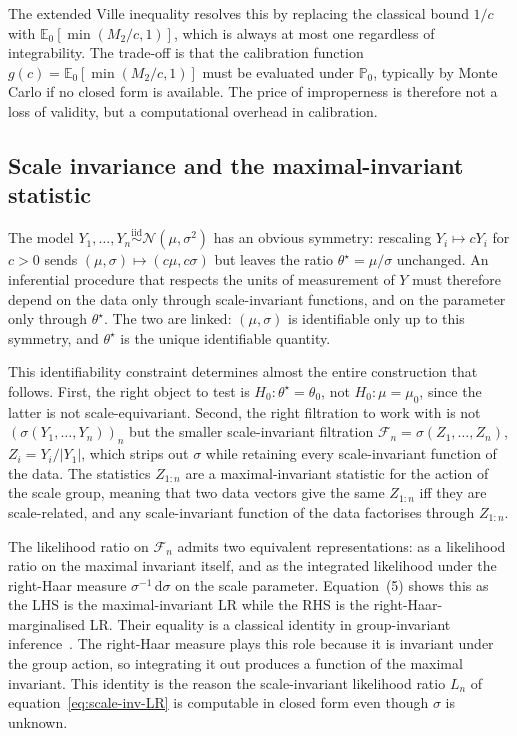 \documentclass[12pt, a4paper]{report}
\newcommand{\E}{\mathbb{E}}
\newcommand{\dd}{\,\mathrm{d}}
\newcommand{\1}{\mathbf{1}}
\begin{document}
The extended Ville inequality \citep{wang2025extended} resolves this by replacing the classical bound \(1/c\) with \(\E_0[\min(M_2/c,1)]\),
which is always at most one regardless of integrability. The trade-off
is that the calibration function \(g(c)=\E_0[\min(M_2/c,1)]\) must be
evaluated under \(\mathbb{P}_0\), typically by Monte Carlo if no closed form is available. The price of improperness is therefore not a loss of
validity, but a computational overhead in calibration.

\subsection{Scale invariance and the maximal-invariant statistic}
The model \(Y_1,\ldots,Y_n\stackrel{\mathrm{iid}}{\sim}\mathcal{N}(\mu,\sigma^2)\)
has an obvious symmetry: rescaling \(Y_i\mapsto cY_i\) for \(c>0\)
sends \((\mu,\sigma)\mapsto(c\mu,c\sigma)\) but leaves the ratio
\(\theta^\star=\mu/\sigma\) unchanged. An inferential procedure that
respects the units of measurement of \(Y\) must therefore depend on
the data only through scale-invariant functions, and on the parameter
only through \(\theta^\star\). The two are linked: \((\mu,\sigma)\) is
identifiable only up to this symmetry, and \(\theta^\star\) is the
unique identifiable quantity.

This identifiability constraint determines almost the entire
construction that follows. First, the right object to test is
\(H_0:\theta^\star=\theta_0\), not \(H_0:\mu=\mu_0\), since the latter
is not scale-equivariant. Second, the right filtration to work with is
not \((\sigma(Y_1,\ldots,Y_n))_n\) but the smaller scale-invariant
filtration \(\mathcal{F}_n=\sigma(Z_1,\ldots,Z_n)\), \(Z_i=Y_i/|Y_1|\),
which strips out \(\sigma\) while retaining every scale-invariant
function of the data. The statistics \(Z_{1:n}\) are a maximal-invariant statistic for the action of the scale group, meaning that two data vectors give the same \(Z_{1:n}\) iff they are scale-related, and any scale-invariant function of the data factorises through \(Z_{1:n}\).

The likelihood ratio on \(\mathcal{F}_n\) admits two equivalent
representations: as a likelihood ratio on the maximal invariant
itself, and as the integrated likelihood under the right-Haar measure
\(\sigma^{-1}\dd\sigma\) on the scale parameter. Equation~(5) shows this as the LHS is the maximal-invariant LR while the RHS is the
right-Haar-marginalised LR. Their equality is a classical identity in
group-invariant inference~\citep{eaton1989group, lehmann2005testing}. The right-Haar measure
plays this role because it is invariant under the group action, so
integrating it out produces a function of the maximal invariant. This
identity is the reason the scale-invariant likelihood ratio \(L_n\) of
equation~\eqref{eq:scale-inv-LR} is computable in closed form even though \(\sigma\) is unknown.
\end{document}

